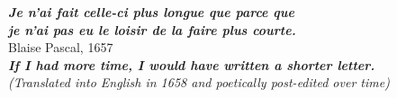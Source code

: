 \thispagestyle{empty}
\hbox{} \vfill
\begin{flushright}
    \textit{\textbf{Je n'ai fait celle-ci plus longue que parce que\\je n'ai pas eu le loisir de la faire plus courte.}}
    \\ \vspace{2.5mm} \small Blaise Pascal, 1657
    \\ \vspace{5mm} \small {\color{gray} \textit{\textbf{If I had more time, I would have written a shorter letter.}}}
    \\ \vspace{2.5mm} \scriptsize {\color{gray} \textit{(Translated into English in 1658 and poetically post-edited over time)}}
\end{flushright}

\clearpage
\thispagestyle{empty}
\cleardoublepage